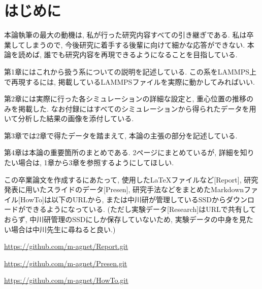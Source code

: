\chapter*{はじめに}

本論執筆の最大の動機は, 私が行った研究内容すべての引き継ぎである. 私は卒業してしまうので, 今後研究に着手する後輩に向けて細かな応答ができない. 本論を読めば, 誰でも研究内容を再現できるようになることを目指している. 

第1章にはこれから扱う系についての説明を記述している. この系をLAMMPS上で再現するには, 掲載しているLAMMPSファイルを実際に動かしてみればいい. 

第2章には実際に行った各シミュレーションの詳細な設定と, 重心位置の推移のみを掲載した. なお付録にはすべてのシミュレーションから得られたデータを用いて分析した結果の画像を添付している. 

第3章では2章で得たデータを踏まえて, 本論の主張の部分を記述している. 

第4章は本論の重要箇所のまとめである. 2ページにまとめているが, 詳細を知りたい場合は, 1章から3章を参照するようにしてほしい. 

この卒業論文を作成するにあたって, 使用した\LaTeX ファイルなど[Report], 研究発表に用いたスライドのデータ[Presen], 研究手法などをまとめたMarkdownファイル[HowTo]は以下のURLから, または中川研が管理しているSSDからダウンロードができるようになっている. (ただし実験データ[Research]はURLで共有しておらず, 中川研管理のSSDにしか保存していないため, 実験データの中身を見たい場合は中川先生に尋ねると良い.)

\href{https://github.com/m-agnet/Report.git}{https://github.com/m-agnet/Report.git}

\href{https://github.com/m-agnet/Presen.git}{https://github.com/m-agnet/Presen.git}

\href{https://github.com/m-agnet/HowTo.git}{https://github.com/m-agnet/HowTo.git}